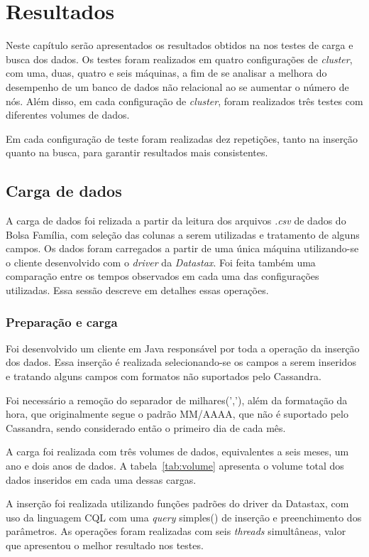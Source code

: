 \chapter{Resultados}

Neste capítulo serão apresentados os resultados obtidos na nos testes de carga e busca dos dados. Os testes foram realizados em quatro configurações de \emph{cluster}, com uma, duas, quatro e seis máquinas, a fim de se analisar a melhora do desempenho de um banco de dados não relacional ao se aumentar o número de nós. Além disso, em cada configuração de \emph{cluster}, foram realizados três testes com diferentes volumes de dados. 

Em cada configuração de teste foram realizadas dez repetições, tanto na inserção quanto na busca, para garantir resultados mais consistentes. 

\section{Carga de dados}
A carga de dados foi relizada a partir da leitura dos arquivos \emph{.csv} de dados do Bolsa Família, com seleção das colunas a serem utilizadas e tratamento de alguns campos.
Os dados foram carregados a partir de uma única máquina utilizando-se o cliente desenvolvido com o \emph{driver} da \emph{Datastax}. Foi feita também uma comparação entre os tempos observados em cada uma das configurações utilizadas. Essa sessão descreve em detalhes essas operações.

\subsection{Preparação e carga}
Foi desenvolvido um cliente em Java responsável por toda a operação da inserção dos dados. Essa inserção é realizada selecionando-se os campos a serem inseridos e tratando alguns campos com formatos não suportados pelo Cassandra. 

Foi necessário a remoção do separador de milhares(','), além da formatação da hora, que originalmente segue o padrão MM/AAAA, que não é suportado pelo Cassandra, sendo considerado então o primeiro dia de cada mês.

A carga foi realizada com três volumes de dados, equivalentes a seis meses, um ano e dois anos de dados. A tabela~\ref{tab:volume} apresenta o volume total dos dados inseridos em cada uma dessas cargas.

A inserção foi realizada utilizando funções padrões do driver da Datastax, com uso da linguagem CQL com uma \emph{query} simples() de inserção e preenchimento dos parâmetros. As operações foram realizadas com seis \emph{threads} simultâneas, valor que apresentou o melhor resultado nos testes. 

